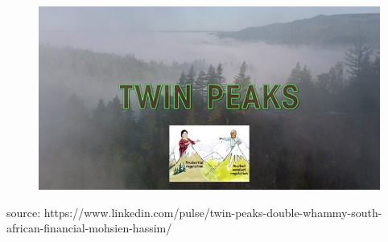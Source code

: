 \documentclass[11pt]{beamer}
\begin{document}







%
\begin{frame}
\begin{center}
\end{center}
\end{frame}

\begin{frame}
\begin{figure}
\includegraphics[width=1 \textwidth]{TwinPeak2}
\end{figure}
\tiny{source: https://www.linkedin.com/pulse/twin-peaks-double-whammy-south-african-financial-mohsien-hassim/}
\end{frame}
\end{document}
